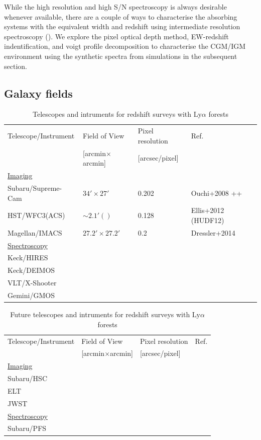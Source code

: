 \documentclass[useAMS,usenatbib,twocolumn]{mn2e}
\newcommand{\LyA}{\mbox{Ly}\alpha}
\begin{document}
While the high resolution and high S/N spectroscopy is always desirable 
whenever available, there are a couple of ways to characterise the absorbing 
systems with the equivalent width and redshift using intermediate resolution 
spectroscopy (\citealt{1998ARA&A..36..267R}). We explore the pixel optical 
depth method, EW-redshift indentification, and voigt profile decomposition 
to characterise the CGM/IGM environment using the synthetic spectra from 
simulations in the subsequent section. 


\subsection{Galaxy fields}
\begin{table}
\centering
\caption{Telescopes and intruments for redshift surveys with $\LyA$ forests}
\label{table:telescope}
\begin{tabular}{llll}
\hline
Telescope/Instrument & Field of View          & Pixel resolution   & Ref. \\
                     & [arcmin$\times$arcmin] & [arcsec/pixel]     &  \\
\hline
\underline{Imaging} \\
Subaru/Supreme-Cam & $34'\times27'$           & 0.202              & Ouchi+2008 ++ \\
HST/WFC3(ACS)      & $ \sim2.1' ()$           & 0.128              & Ellis+2012 (HUDF12)  \\
Magellan/IMACS     & $27.2'\times27.2'$       & 0.2                & Dressler+2014 \\ 
\hline
\underline{Spectroscopy} \\
Keck/HIRES \\
Keck/DEIMOS \\
VLT/X-Shooter \\
Gemini/GMOS \\
\hline
\end{tabular}

\end{table}

\begin{table}
\centering
\caption{Future telescopes and intruments for redshift surveys with $\LyA$ forests}
\label{table:telescope}
\begin{tabular}{llll}
\hline
Telescope/Instrument & Field of View          & Pixel resolution   & Ref. \\
                     & [arcmin$\times$arcmin] & [arcsec/pixel]     &  \\
\hline
\underline{Imaging} \\
Subaru/HSC &            &              &  \\
ELT &            &              &  \\
JWST &            &              &  \\
\hline
\underline{Spectroscopy} \\
Subaru/PFS \\
\hline
\end{tabular}

\end{table}
\end{document}
